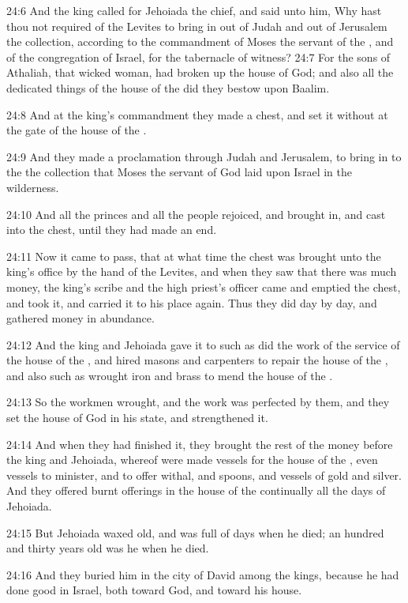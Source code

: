 24:6 And the king called for Jehoiada the chief, and said unto him, Why hast thou not required of the Levites to bring in out of Judah and out of Jerusalem the collection, according to the commandment of Moses the servant of the \LORD, and of the congregation of Israel, for the tabernacle of witness?  24:7 For the sons of Athaliah, that wicked woman, had broken up the house of God; and also all the dedicated things of the house of the \LORD did they bestow upon Baalim.

24:8 And at the king's commandment they made a chest, and set it without at the gate of the house of the \LORD.

24:9 And they made a proclamation through Judah and Jerusalem, to bring in to the \LORD the collection that Moses the servant of God laid upon Israel in the wilderness.

24:10 And all the princes and all the people rejoiced, and brought in, and cast into the chest, until they had made an end.

24:11 Now it came to pass, that at what time the chest was brought unto the king's office by the hand of the Levites, and when they saw that there was much money, the king's scribe and the high priest's officer came and emptied the chest, and took it, and carried it to his place again. Thus they did day by day, and gathered money in abundance.

24:12 And the king and Jehoiada gave it to such as did the work of the service of the house of the \LORD, and hired masons and carpenters to repair the house of the \LORD, and also such as wrought iron and brass to mend the house of the \LORD.

24:13 So the workmen wrought, and the work was perfected by them, and they set the house of God in his state, and strengthened it.

24:14 And when they had finished it, they brought the rest of the money before the king and Jehoiada, whereof were made vessels for the house of the \LORD, even vessels to minister, and to offer withal, and spoons, and vessels of gold and silver. And they offered burnt offerings in the house of the \LORD continually all the days of Jehoiada.

24:15 But Jehoiada waxed old, and was full of days when he died; an hundred and thirty years old was he when he died.

24:16 And they buried him in the city of David among the kings, because he had done good in Israel, both toward God, and toward his house.

